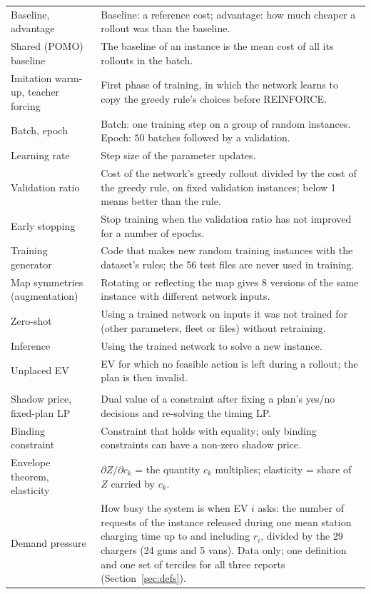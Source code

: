 \begin{xltabular}{\textwidth}{@{}>{\raggedright\arraybackslash}p{4.0cm}X@{}}
Baseline, advantage & Baseline: a reference cost; advantage: how much cheaper a rollout was than the baseline. \\
Shared (POMO) baseline & The baseline of an instance is the mean cost of all its rollouts in the batch. \\
Imitation warm-up, teacher forcing & First phase of training, in which the network learns to copy the greedy rule's choices before REINFORCE. \\
Batch, epoch & Batch: one training step on a group of random instances. Epoch: \(50\) batches followed by a validation. \\
Learning rate & Step size of the parameter updates. \\
Validation ratio & Cost of the network's greedy rollout divided by the cost of the greedy rule, on fixed validation instances; below 1 means better than the rule. \\
Early stopping & Stop training when the validation ratio has not improved for a number of epochs. \\
Training generator & Code that makes new random training instances with the dataset's rules; the 56 test files are never used in training. \\
Map symmetries (augmentation) & Rotating or reflecting the map gives 8 versions of the same instance with different network inputs. \\
Zero-shot & Using a trained network on inputs it was not trained for (other parameters, fleet or files) without retraining. \\
Inference & Using the trained network to solve a new instance. \\
Unplaced EV & EV for which no feasible action is left during a rollout; the plan is then invalid. \\
 \\
Shadow price, fixed-plan LP & Dual value of a constraint after fixing a plan's yes/no decisions and re-solving the timing LP. \\
Binding constraint & Constraint that holds with equality; only binding constraints can have a non-zero shadow price. \\
Envelope theorem, elasticity & $\partial Z/\partial c_k$ = the quantity $c_k$ multiplies; elasticity = share of $Z$ carried by $c_k$. \\
Demand pressure & How busy the system is when EV $i$ asks: the number of requests of the instance released during one mean station charging time up to and including $r_i$, divided by the 29 chargers (24 guns and 5 vans). Data only; one definition and one set of terciles for all three reports (Section~\ref{sec:defs}). \\

\end{xltabular}
